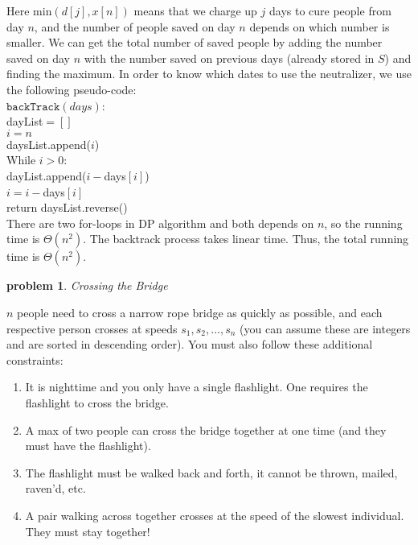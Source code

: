\documentclass[10pt]{article}
\newtheorem{problem}{\sc\color{cit}problem}
\begin{document}
\begin{enumerate}
\begin{align}
    \end{align}\\
    Here min$(d[j], x[n])$ means that we charge up $j$ days to cure people from day $n$, and the number of people saved on day $n$ depends on which number is smaller. We can get the total number of saved people by adding the number saved on day $n$ with the number saved on previous days (already stored in $S$) and finding the maximum. In order to know which dates to use the neutralizer, we use the following pseudo-code:\\
    $\mathtt{backTrack}(days)$:\\
    \-\hspace{0.5cm} dayList$=[]$\\
    \-\hspace{0.5cm} $i = n$\\
    \-\hspace{0.5cm} daysList.append($i$)\\
    \-\hspace{0.5cm} While $i > 0$:\\
    \-\hspace{1cm} dayList.append($i-$days$[i]$)\\
    \-\hspace{1cm} $i=i-$days$[i]$\\
    \-\hspace{0.5cm} return daysList.reverse()\\
    There are two for-loops in DP algorithm and both depends on $n$, so the running time is $\Theta(n^2)$. The backtrack process takes linear time. Thus, the total running time is $\Theta(n^2)$.
    
\end{enumerate}

\newpage
\begin{problem} Crossing the Bridge \end{problem}
    $n$ people need to cross a narrow rope bridge as quickly as possible, and each respective person crosses at speeds $s_1, s_2, ... , s_n$ (you can assume these are integers and are sorted in descending order). You must also follow these additional constraints:

    \begin{enumerate}
        \item It is nighttime and you only have a single flashlight. One requires the flashlight to cross the bridge.
        \item A max of two people can cross the bridge together at one time (and they must have the flashlight).
        \item The flashlight must be walked back and forth, it cannot be thrown, mailed, raven'd, etc.
        \item A pair walking across together crosses at the speed of the slowest individual. They must stay together!
    \end{enumerate}
\end{document}
